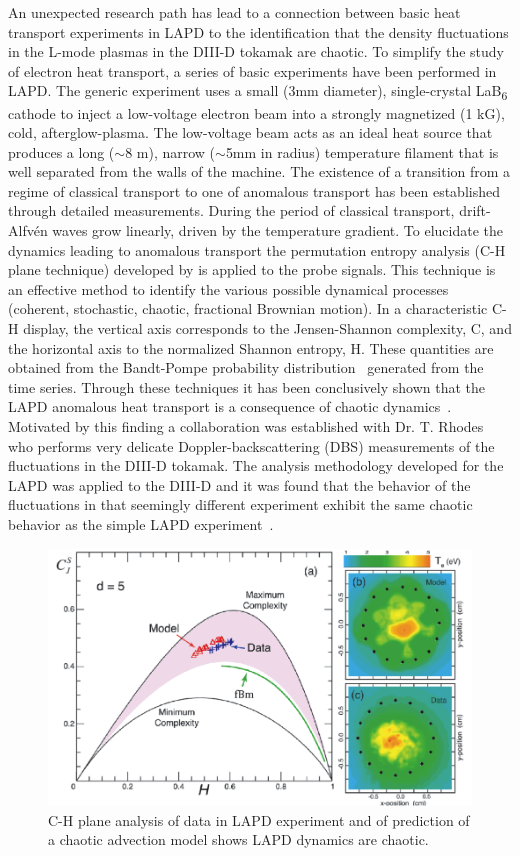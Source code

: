 \documentclass[11pt]{article}
\renewcommand{\cite}{\citep}
\begin{document}
An unexpected research path has lead to a connection between basic heat
transport experiments in LAPD to the identification that the density
fluctuations in the L-mode plasmas in the DIII-D tokamak are chaotic. To
simplify the study of electron heat transport, a series of basic
experiments have been performed in LAPD. The generic experiment uses a
small (3mm diameter), single-crystal LaB\textsubscript{6} cathode to
inject a low-voltage electron beam into a strongly magnetized (1 kG),
cold, afterglow-plasma. The low-voltage beam acts as an ideal heat
source that produces a long ($\sim$8 m), narrow ($\sim$5mm in radius) temperature
filament that is well separated from the walls of the machine. The
existence of a transition from a regime of classical transport to one of
anomalous transport has been established through detailed measurements.
During the period of classical transport, drift-Alfvén waves grow
linearly, driven by the temperature gradient. To elucidate the dynamics
leading to anomalous transport the permutation entropy analysis (C-H
plane technique) developed by \citep{rosso:2007} is applied to the
probe signals. This technique is an effective method to identify the
various possible dynamical processes (coherent, stochastic, chaotic,
fractional Brownian motion). In a characteristic C-H display, the
vertical axis corresponds to the Jensen-Shannon complexity, C, and the
horizontal axis to the normalized Shannon entropy, H. These quantities
are obtained from the Bandt-Pompe probability distribution~\cite{bandt:2002}
generated from the time series. Through these techniques it has been
conclusively shown that the LAPD anomalous heat transport is a
consequence of chaotic dynamics~\cite{pace:2008,maggs:2012a,maggs:2012b,maggs:2013}. Motivated by this finding a
collaboration was established with Dr. T. Rhodes who performs very
delicate Doppler-backscattering (DBS) measurements of the fluctuations
in the DIII-D tokamak. The analysis methodology developed for the LAPD
was applied to the DIII-D and it was found that the behavior of the
fluctuations in that seemingly different experiment exhibit the same
chaotic behavior as the simple LAPD experiment~\cite{maggs:2015}.

\begin{figure}[!htbp]
\centerline{\includegraphics[width=3.8truein]{chaos1}}
\caption{C-H plane analysis of data in LAPD experiment and of prediction
of a chaotic advection model shows LAPD dynamics are chaotic.}\label{chaos1}
\end{figure}
\end{document}
